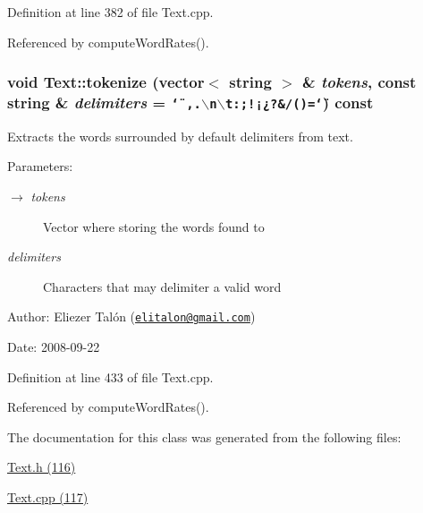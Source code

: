 Definition at line 382 of file Text.cpp.

Referenced by computeWordRates().\hypertarget{class_text_09f6b1e475da423ac81305500e05c7d6}{
\subsubsection[tokenize]{\setlength{\rightskip}{0pt plus 5cm}void Text::tokenize (vector$<$ string $>$ \& {\em tokens}, \/  const string \& {\em delimiters} = {\tt \char`\"{}~,.$\backslash$n$\backslash$t:;!¡¿?\&/()=\char`\"{}}) const}}
\label{class_text_09f6b1e475da423ac81305500e05c7d6}


Extracts the words surrounded by default delimiters from text. 

\begin{Desc}
\item[Parameters:]
\begin{description}
\item[\mbox{$\rightarrow$} {\em tokens}]Vector where storing the words found to \item[{\em delimiters}]Characters that may delimiter a valid word\end{description}
\end{Desc}
\begin{Desc}
\item[Author:]Eliezer Talón (\href{mailto:elitalon@gmail.com}{\tt elitalon@gmail.com}) \end{Desc}
\begin{Desc}
\item[Date:]2008-09-22 \end{Desc}


Definition at line 433 of file Text.cpp.

Referenced by computeWordRates().

The documentation for this class was generated from the following files:\begin{CompactItemize}
\item 
\hyperlink{_text_8h}{Text.h (116)}\item 
\hyperlink{_text_8cpp}{Text.cpp (117)}\end{CompactItemize}
